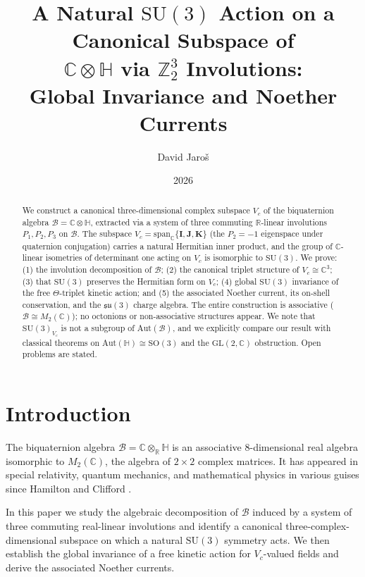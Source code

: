 \documentclass[12pt,a4paper]{article}
\title{%
  A Natural $\mathrm{SU}(3)$ Action on a Canonical Subspace of\\
  $\mathbb{C}\otimes\mathbb{H}$ via $\mathbb{Z}_2^3$ Involutions:\\
  Global Invariance and Noether Currents
}
\author{David Jaro\v{s}}
\date{2026}
\theoremstyle{remark}
\newcommand{\B}{\mathcal{B}}          %
\newcommand{\C}{\mathbb{C}}
\newcommand{\R}{\mathbb{R}}
\newcommand{\H}{\mathbb{H}}
\begin{document}
\maketitle

\begin{abstract}
We construct a canonical three-dimensional complex subspace $V_c$ of the
biquaternion algebra $\B = \C\otimes\H$, extracted via a system of three
commuting $\R$-linear involutions $P_1, P_2, P_3$ on $\B$.  The subspace
$V_c = \mathrm{span}_\C\{\mathbf{I},\mathbf{J},\mathbf{K}\}$ (the $P_2 = -1$
eigenspace under quaternion conjugation) carries a natural Hermitian inner
product, and the group of $\C$-linear isometries of determinant one acting on
$V_c$ is isomorphic to $\mathrm{SU}(3)$.  We prove: (1) the involution
decomposition of $\B$; (2) the canonical triplet structure of $V_c \cong \C^3$;
(3) that $\mathrm{SU}(3)$ preserves the Hermitian form on $V_c$; (4) global
$\mathrm{SU}(3)$ invariance of the free $\Theta$-triplet kinetic action; and
(5) the associated Noether current, its on-shell conservation, and the
$\mathfrak{su}(3)$ charge algebra.  The entire construction is associative
($\B \cong M_2(\C)$); no octonions or non-associative structures appear.
We note that $\mathrm{SU}(3)_{V_c}$ is not a subgroup of $\mathrm{Aut}(\B)$,
and we explicitly compare our result with classical theorems on
$\mathrm{Aut}(\H) \cong \mathrm{SO}(3)$ and the $\mathrm{GL}(2,\C)$
obstruction.  Open problems are stated.
\end{abstract}

\tableofcontents

\section{Introduction}

The biquaternion algebra $\B = \C\otimes_\R\H$ is an associative
$8$-dimensional real algebra isomorphic to $M_2(\C)$, the algebra of
$2\times 2$ complex matrices.  It has appeared in special relativity, quantum
mechanics, and mathematical physics in various guises since Hamilton and
Clifford \cite{Hamilton1866,Clifford1878}.

In this paper we study the algebraic decomposition of $\B$ induced by a
system of three commuting real-linear involutions and identify a canonical
three-complex-dimensional subspace on which a natural $\mathrm{SU}(3)$
symmetry acts.  We then establish the global invariance of a free kinetic
action for $V_c$-valued fields and derive the associated Noether currents.
\end{document}
